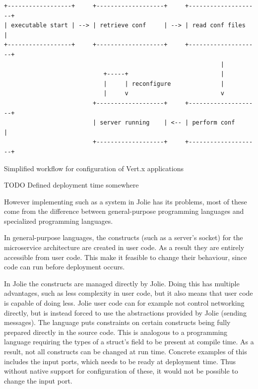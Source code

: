 \begin{listing}[H]
\begin{verbatim}
+------------------+     +-------------------+     +--------------------+
| executable start | --> | retrieve conf     | --> | read conf files    |
+------------------+     +-------------------+     +--------------------+
                                                             |
                            +-----+                          |
                            |     | reconfigure              |
                            |     v                          v
                         +-------------------+     +--------------------+
                         | server running    | <-- | perform conf       |
                         +-------------------+     +--------------------+
\end{verbatim}
\caption{Simplified workflow for configuration of Vert.x applications}
\label{fig:normal_conf}
\end{listing}


TODO Defined deployment time somewhere

However implementing such as a system in Jolie has its problems, most of these
come from the difference between general-purpose programming languages and
specialized programming languages.

In general-purpose languages, the constructs (such as a server's socket) for
the microservice architecture are created in user code. As a result they are
entirely accessible from user code. This make it feasible to change their
behaviour, since code can run before deployment occurs.

In Jolie the constructs are managed directly by Jolie. Doing this has multiple
advantages, such as less complexity in user code, but it also means that user
code is capable of doing less. Jolie user code can for example not control
networking directly, but is instead forced to use the abstractions provided by
Jolie (sending messages). The language puts constraints on certain
constructs being fully prepared directly in the source code. This is analogous
to a programming language requiring the types of a struct's field to be present
at compile time. As a result, not all constructs can be changed at run time.
Concrete examples of this includes the input ports, which needs to be ready at
deployment time. Thus without native support for configuration of these, it
would not be possible to change the input port.

